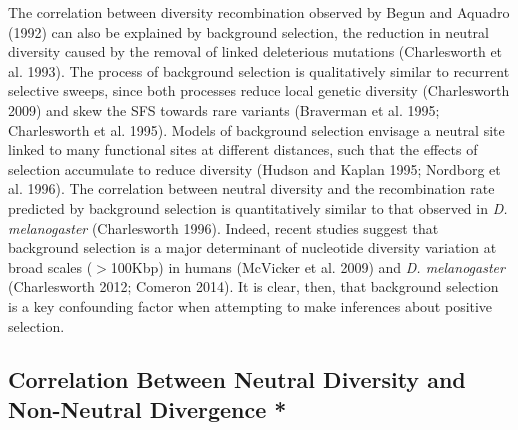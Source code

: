 The correlation between diversity recombination observed by Begun and Aquadro (1992) can also be explained by background selection, the reduction in neutral diversity caused by the removal of linked deleterious mutations (Charlesworth et al. 1993). The process of background selection is qualitatively similar to recurrent selective sweeps, since both processes reduce local genetic diversity (Charlesworth 2009) and skew the SFS towards rare variants (Braverman et al. 1995; Charlesworth et al. 1995). Models of background selection envisage a neutral site linked to many functional sites at different distances, such that the effects of selection accumulate to reduce diversity (Hudson and Kaplan 1995; Nordborg et al. 1996). The correlation between neutral diversity and the recombination rate predicted by background selection is quantitatively similar to that observed in \emph{D. melanogaster} (Charlesworth 1996). Indeed, recent studies suggest that background selection is a major determinant of nucleotide diversity variation at broad scales ($>$100Kbp) in humans (McVicker et al. 2009) and \emph{D. melanogaster} (Charlesworth 2012; Comeron 2014). It is clear, then, that background selection is a key confounding factor when attempting to make inferences about positive selection.
 
\subsection[Using models of selective sweeps to estimate positive selection parameters]{Correlation Between Neutral Diversity and Non-Neutral Divergence *}

